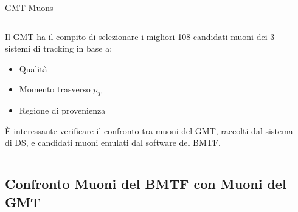 \documentclass{beamer}
\begin{document}
\begin{frame}{GMT Muons}

\begin{columns}

    \begin{column}{0.5\textwidth}
    
    Il GMT ha il compito di selezionare i migliori 108 candidati muoni dei 3 sistemi di tracking in base a:
    \begin{itemize}
        \item Qualità
        \item Momento trasverso $p_T$
        \item Regione di provenienza
    \end{itemize}
    \vspace{0.3cm}

    È interessante verificare il confronto tra muoni del GMT, raccolti dal sistema di DS, e candidati muoni emulati dal software del BMTF.

    

    \end{column}
    \begin{column}{0.5\textwidth}
        \centering
    \end{column}
\end{columns}

\end{frame}

\subsection{Confronto Muoni del BMTF con Muoni del GMT}
\end{document}

